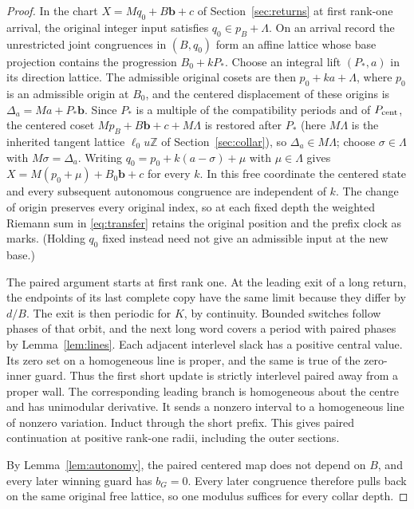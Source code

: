 \documentclass[11pt,reqno]{amsart}
\theoremstyle{definition}
\newcommand{\Z}{\mathbb Z}
\begin{document}
\begin{proof}
In the chart \(X=Mq_0+B\mathbf b+c\) of Section~\ref{sec:returns} at
first rank-one arrival, the original integer input satisfies
\(q_0\in p_B+\Lambda\). On an arrival record the unrestricted joint
congruences in \((B,q_0)\) form an affine lattice whose base projection
contains the progression \(B_0+kP_*\). Choose an integral lift
\((P_*,a)\) in its direction lattice. The admissible original cosets are
then \(p_0+ka+\Lambda\), where \(p_0\) is an admissible origin at \(B_0\),
and the centered displacement of these origins is
\(\Delta_a=Ma+P_*\mathbf b\). Since \(P_*\) is a multiple of the compatibility
periods and of \(P_{\rm cent}\), the centered coset \(Mp_B+B\mathbf b+c+M\Lambda\) is restored after
\(P_*\) (here \(M\Lambda\) is the inherited tangent lattice \(\ell_0u\Z\) of
Section~\ref{sec:collar}), so \(\Delta_a\in M\Lambda\); choose
\(\sigma\in\Lambda\) with \(M\sigma=\Delta_a\). Writing
\(q_0=p_0+k(a-\sigma)+\mu\) with \(\mu\in\Lambda\) gives
\(X=M(p_0+\mu)+B_0\mathbf b+c\) for every \(k\). In this free coordinate the centered state and every subsequent
autonomous congruence are independent of \(k\). The change of origin
preserves every original index, so at each fixed depth the weighted Riemann
sum in \eqref{eq:transfer} retains the original position and the prefix
clock as marks. (Holding \(q_0\) fixed instead need not give an admissible
input at the new base.)

The paired argument starts at first rank one. At the leading
exit of a long return, the endpoints of its last complete copy have
the same limit because they differ by \(d/B\). The exit is then
periodic for \(K\), by continuity. Bounded switches follow phases
of that orbit, and the next long word covers a period with paired
phases by Lemma~\ref{lem:lines}. Each adjacent interlevel slack has a
positive central value. Its zero set on a homogeneous line is
proper, and the same is true of the zero-inner guard. Thus the
first short update is strictly interlevel paired away from a proper
wall. The corresponding leading branch is homogeneous about the
centre and has unimodular derivative. It sends a nonzero interval
to a homogeneous line of nonzero variation. Induct through the
short prefix. This gives paired continuation at positive rank-one
radii, including the outer sections.

By Lemma~\ref{lem:autonomy}, the paired centered map does not depend on
\(B\), and every later winning guard has \(b_G=0\). Every later
congruence therefore pulls back on the same original free lattice, so
one modulus suffices for every collar depth.
\end{proof}
\end{document}
